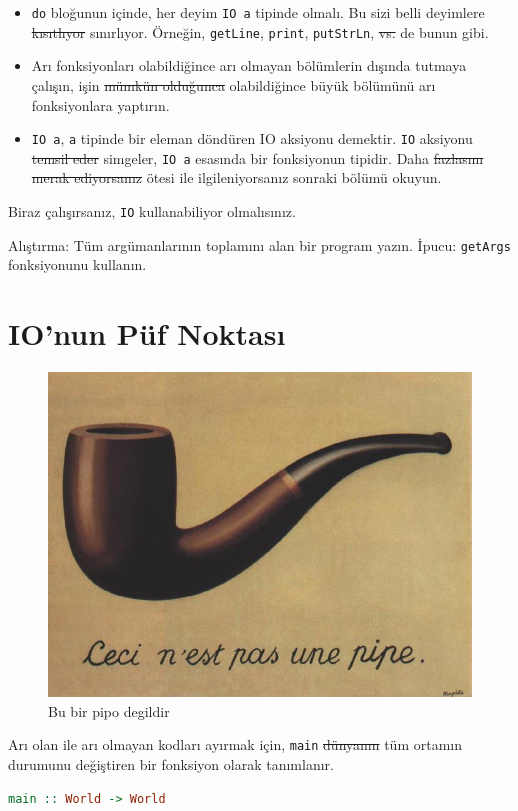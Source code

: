 \documentclass[a4paper,14pt,openany]{extbook} %
\providecommand{\tightlist}{%
  \setlength{\itemsep}{0pt}\setlength{\parskip}{0pt}}
\begin{document}
\begin{itemize}
  \tightlist
\item
  \lstinline!do! bloğunun içinde, her deyim \lstinline!IO a! tipinde
  olmalı. Bu sizi belli deyimlere \st{kısıtlıyor} sınırlıyor. Örneğin,
  \lstinline!getLine!, \lstinline!print!, \lstinline!putStrLn!, \st{vs.} de bunun gibi.
\item
  Arı fonksiyonları olabildiğince arı olmayan bölümlerin dışında tutmaya
  çalışın, işin \st{mümkün olduğunca} olabildiğince büyük bölümünü arı fonksiyonlara
  yaptırın.
\item
  \lstinline!IO a!, \lstinline!a! tipinde bir eleman döndüren IO
  aksiyonu demektir. \lstinline!IO! aksiyonu \st{temsil eder} simgeler,
  \lstinline!IO a! esasında bir fonksiyonun tipidir. Daha \st{fazlasını
  merak ediyorsanız} ötesi ile ilgileniyorsanız sonraki bölümü okuyun.
\end{itemize}

Biraz çalışırsanız, \lstinline!IO! kullanabiliyor olmalısınız.

Alıştırma: Tüm argümanlarının toplamını alan bir program yazın. İpucu:
  \lstinline!getArgs! fonksiyonunu kullanın.

\section{IO'nun Püf Noktası}\label{ionun-puxfcf-noktasux131}

\begin{figure}[htbp]
  \centering
  \includegraphics[width=0.5\linewidth]{img/magritte_pipe.jpg}
  \caption{Bu bir pipo degildir}
\end{figure}

Arı olan ile arı olmayan kodları ayırmak için, \lstinline!main! \st{dünyanın}
  tüm ortamın durumunu değiştiren bir fonksiyon olarak tanımlanır.

\begin{lstlisting}[language=Haskell]
  main :: World -> World
\end{lstlisting}
\end{document}
